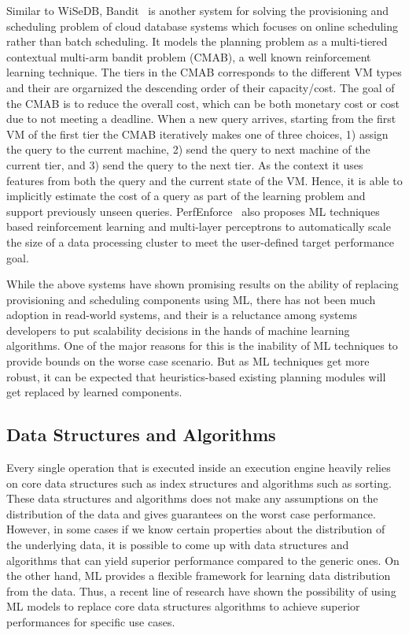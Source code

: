 Similar to WiSeDB, Bandit~\cite{bandit} is another system for solving the provisioning and scheduling problem of cloud database systems which focuses on online scheduling rather than batch scheduling.
It models the planning problem as a multi-tiered contextual multi-arm bandit problem (CMAB), a well known reinforcement learning technique.
The tiers in the CMAB corresponds to the different VM types and their are orgarnized the descending order of their capacity/cost. 
The goal of the CMAB is to reduce the overall cost, which can be both monetary cost or cost due to not meeting a deadline.
When a new query arrives, starting from the first VM of the first tier the CMAB iteratively makes one of three choices, 1) assign the query to the current machine, 2) send the query to next machine of the current tier, and 3) send the query to the next tier.
As the context it uses features from both the query and the current state of the VM. Hence, it is able to implicitly estimate the cost of a query as part of the learning problem and support previously unseen queries.
PerfEnforce~\cite{perfenforce} also proposes ML techniques based reinforcement learning and multi-layer perceptrons to automatically scale the size of a data processing cluster to meet the user-defined target performance goal.

While the above systems have shown promising results on the ability of replacing provisioning and scheduling components using ML, there has not been much adoption in read-world systems, and their is a reluctance among systems developers to put scalability decisions in the hands of machine learning algorithms.
One of the major reasons for this is the inability of ML techniques to provide bounds on the worse case scenario.
But as ML techniques get more robust, it can be expected that heuristics-based existing planning modules will get replaced by learned components.


\subsection{Data Structures and Algorithms}
Every single operation that is executed inside an execution engine heavily relies on core data structures such as index structures and algorithms such as sorting.
These data structures and algorithms does not make any assumptions on the distribution of the data and gives guarantees on the worst case performance.
However, in some cases if we know certain properties about the distribution of the underlying data, it is possible to come up with data structures and algorithms that can yield superior performance compared to the generic ones.
On the other hand, ML provides a flexible framework for learning data distribution from the data.
Thus, a recent line of research have shown the possibility of using ML models to replace core data structures algorithms to achieve superior performances for specific use cases.

